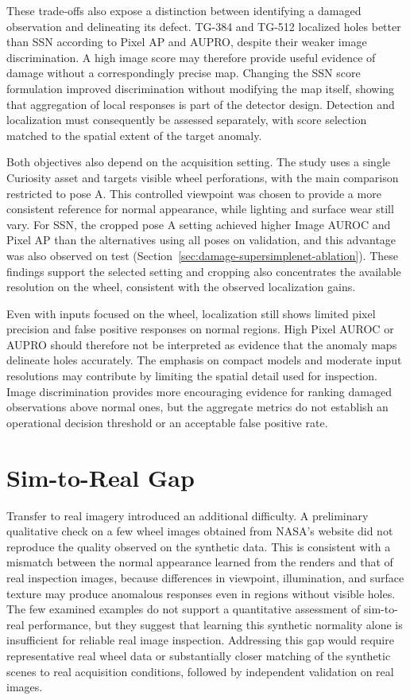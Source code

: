 These trade-offs also expose a distinction between identifying a damaged observation and delineating its defect. TG-384 and TG-512 localized holes better than SSN according to Pixel AP and AUPRO, despite their weaker image discrimination. A high image score may therefore provide useful evidence of damage without a correspondingly precise map. Changing the SSN score formulation improved discrimination without modifying the map itself, showing that aggregation of local responses is part of the detector design. Detection and localization must consequently be assessed separately, with score selection matched to the spatial extent of the target anomaly.

Both objectives also depend on the acquisition setting. The study uses a single Curiosity asset and targets visible wheel perforations, with the main comparison restricted to pose A. This controlled viewpoint was chosen to provide a more consistent reference for normal appearance, while lighting and surface wear still vary. For SSN, the cropped pose A setting achieved higher Image AUROC and Pixel AP than the alternatives using all poses on validation, and this advantage was also observed on test (Section~\ref{sec:damage-supersimplenet-ablation}). These findings support the selected setting and cropping also concentrates the available resolution on the wheel, consistent with the observed localization gains.

Even with inputs focused on the wheel, localization still shows limited pixel precision and false positive responses on normal regions. High Pixel AUROC or AUPRO should therefore not be interpreted as evidence that the anomaly maps delineate holes accurately. The emphasis on compact models and moderate input resolutions may contribute by limiting the spatial detail used for inspection. Image discrimination provides more encouraging evidence for ranking damaged observations above normal ones, but the aggregate metrics do not establish an operational decision threshold or an acceptable false positive rate.

\section{Sim-to-Real Gap}

Transfer to real imagery introduced an additional difficulty. A preliminary qualitative check on a few wheel images obtained from NASA's website did not reproduce the quality observed on the synthetic data. This is consistent with a mismatch between the normal appearance learned from the renders and that of real inspection images, because differences in viewpoint, illumination, and surface texture may produce anomalous responses even in regions without visible holes. The few examined examples do not support a quantitative assessment of sim-to-real performance, but they suggest that learning this synthetic normality alone is insufficient for reliable real image inspection. Addressing this gap would require representative real wheel data or substantially closer matching of the synthetic scenes to real acquisition conditions, followed by independent validation on real images.
